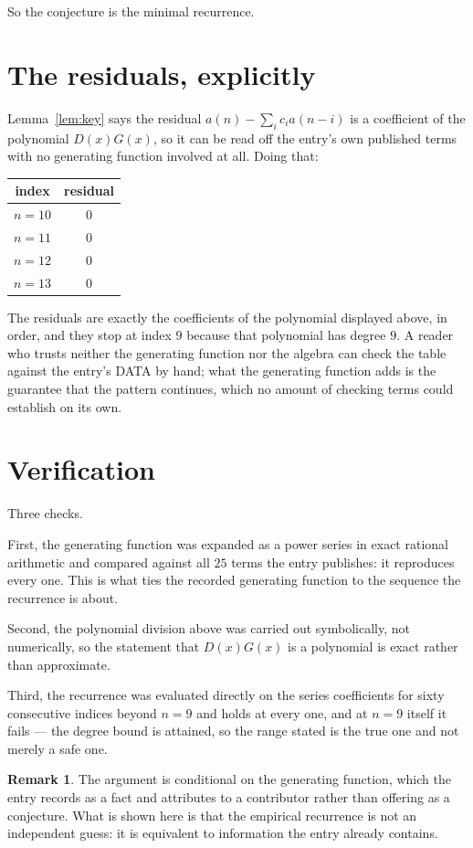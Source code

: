 \documentclass[11pt,a4paper]{article}
\theoremstyle{plain}
\theoremstyle{definition}
\newtheorem{remark}[theorem]{Remark}
\begin{document}
So the conjecture is the minimal recurrence.

\section{The residuals, explicitly}

Lemma~\ref{lem:key} says the residual $a(n)-\sum_ic_ia(n-i)$ is a coefficient of the
polynomial $D(x)G(x)$, so it can be read off the entry's own published terms with no
generating function involved at all. Doing that:
\begin{center}
\begin{tabular}{cc}
index & residual \\ \hline
$n=10$ & $0$ \\
$n=11$ & $0$ \\
$n=12$ & $0$ \\
$n=13$ & $0$
\end{tabular}
\end{center}
The residuals are exactly the coefficients of the polynomial displayed above, in order, and
they stop at index $9$ because that polynomial has degree $9$. A reader who trusts
neither the generating function nor the algebra can check the table against the entry's DATA
by hand; what the generating function adds is the guarantee that the pattern continues, which
no amount of checking terms could establish on its own.

\section{Verification}

Three checks.

First, the generating function was expanded as a power series in exact rational arithmetic and
compared against all $25$ terms the entry publishes: it reproduces every one. This is
what ties the recorded generating function to the sequence the recurrence is about.

Second, the polynomial division above was carried out symbolically, not numerically, so the
statement that $D(x)G(x)$ is a polynomial is exact rather than approximate.

Third, the recurrence was evaluated directly on the series coefficients for sixty consecutive
indices beyond $n=9$ and holds at every one, and at $n=9$ itself it fails --- the
degree bound is attained, so the range stated is the true one and not merely a safe one.

\begin{remark}
The argument is conditional on the generating function, which the entry records as a fact and
attributes to a contributor rather than offering as a conjecture. What is shown here is that
the empirical recurrence is not an independent guess: it is equivalent to information the
entry already contains.
\end{remark}
\end{document}
